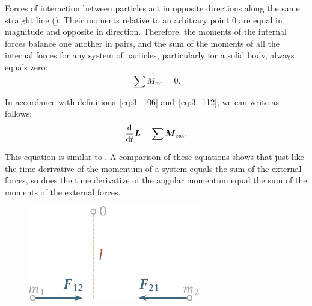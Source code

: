 
Forces of interaction between particles act in opposite directions along the same straight line (). Their moments relative to an arbitrary point $0$ are equal in magnitude and opposite in direction. Therefore, the moments of the internal forces balance one another in pairs, and the sum of the moments of all the internal forces for any system of particles, particularly for a solid body, always equals zero:
\begin{equation}\label{eq:3_117}
\sum\vec{M}_{\text{int}} = 0.
\end{equation}

In accordance with definitions~\eqref{eq:3_106} and~\eqref{eq:3_112}, we can write  as follows:
\begin{equation}\label{eq:3_118}
\frac{\mathrm{d}}{\mathrm{d} t}\boldsymbol{L} = \sum\boldsymbol{M}_{\text{ext}}.
\end{equation}

\noindent
This equation is similar to . A comparison of these equations shows that just like the time derivative of the momentum of a system equals the sum of the external forces, so does the time derivative of the angular momentum equal the sum of the moments of the external forces.

\begin{figure}[t]
	\begin{center}
		\includegraphics[scale=0.9]{figures/ch_03/fig_3_23.pdf}
		\caption[]{}
		\label{fig:3_23}
	\end{center}
	\vspace{-0.9cm}
\end{figure}

